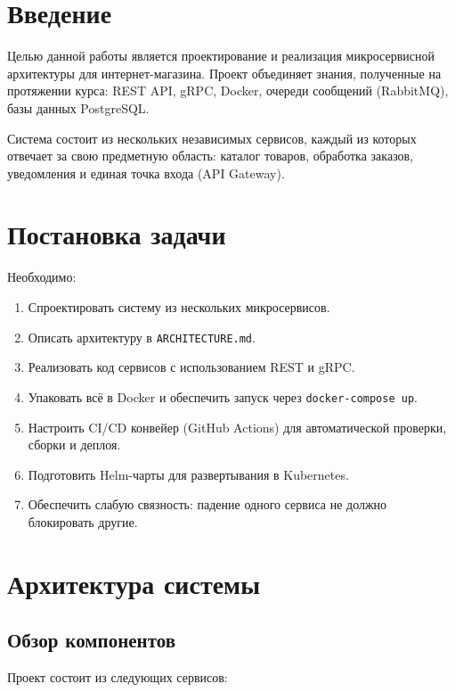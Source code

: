 \documentclass[14pt]{article}
\begin{document}


\tableofcontents
\newpage

\section{Введение}

Целью данной работы является проектирование и реализация микросервисной архитектуры для интернет-магазина. Проект объединяет знания, полученные на протяжении курса: REST API, gRPC, Docker, очереди сообщений (RabbitMQ), базы данных PostgreSQL.

Система состоит из нескольких независимых сервисов, каждый из которых отвечает за свою предметную область: каталог товаров, обработка заказов, уведомления и единая точка входа (API Gateway).

\section{Постановка задачи}

Необходимо:
\begin{enumerate}
    \item Спроектировать систему из нескольких микросервисов.
    \item Описать архитектуру в \texttt{ARCHITECTURE.md}.
    \item Реализовать код сервисов с использованием REST и gRPC.
    \item Упаковать всё в Docker и обеспечить запуск через \texttt{docker-compose up}.
    \item Настроить CI/CD конвейер (GitHub Actions) для автоматической проверки, сборки и деплоя.
    \item Подготовить Helm-чарты для развертывания в Kubernetes.
    \item Обеспечить слабую связность: падение одного сервиса не должно блокировать другие.
\end{enumerate}

\section{Архитектура системы}

\subsection{Обзор компонентов}

Проект состоит из следующих сервисов:
\end{document}

